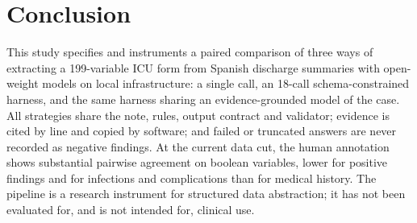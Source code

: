 \section{Conclusion}\label{sec:conclusion}

This study specifies and instruments a paired comparison of three ways of extracting a 199-variable ICU form
from Spanish discharge summaries with open-weight models on local infrastructure: a single call, an 18-call
schema-constrained harness, and the same harness sharing an evidence-grounded model of the case. All strategies share the note, rules, output contract and
validator; evidence is cited by line and copied by software; and failed or truncated answers are never
recorded as negative findings. At the current data cut, the human annotation shows substantial pairwise
agreement on boolean variables, lower for positive findings and for infections and complications than for
medical history.  The pipeline is a research instrument for structured data
abstraction; it has not been evaluated for, and is not intended for, clinical use.

